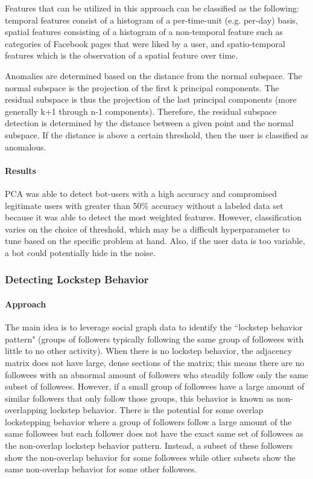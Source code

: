 \documentclass[11pt, oneside]{article}   	%
\begin{document}
\quad Features that can be utilized in this approach can be classified as the following: temporal features consist of a histogram of a per-time-unit (e.g. per-day) basis, spatial features consisting of a histogram of a non-temporal feature such as categories of Facebook pages that were liked by a user, and spatio-temporal features which is the observation of a spatial feature over time.

\quad Anomalies are determined based on the distance from the normal subspace.
The normal subspace is the projection of the first k principal components.
The residual subspace is thus the projection of the last principal components (more generally k+1 through n-1 components).
Therefore, the residual subspace detection is determined by the distance between a given point and the normal subspace.
If the distance is above a certain threshold, then the user is classified as anomalous.

\paragraph{Results}
\quad

\quad PCA was able to detect bot-users with a high accuracy and compromised legitimate users with greater than 50\% accuracy without a labeled data set because it was able to detect the most weighted features.
However, classification varies on the choice of threshold, which may be a difficult hyperparameter to tune based on the specific problem at hand.
Also, if the user data is too variable, a bot could potentially hide in the noise.

\subsubsection{Detecting Lockstep Behavior}

\paragraph{Approach}
\quad

\quad The main idea \cite{lockstep} is to leverage social graph data to identify the ``lockstep behavior pattern" (groups of followers typically following the same group of followees with little to no other activity).
When there is no lockstep behavior, the adjacency matrix does not have large, dense sections of the matrix; this means there are no followees with an abnormal amount of followers who steadily follow only the same subset of followees.
However, if a small group of followees have a large amount of similar followers that only follow those groups, this behavior is known as non-overlapping lockstep behavior.
There is the potential for some overlap lockstepping behavior where a group of followers follow a large amount of the same followees but each follower does not have the exact same set of followees as the non-overlap lockstep behavior pattern.
Instead, a subset of these followers show the non-overlap behavior for some followees while other subsets show the same non-overlap behavior for some other followees.
\end{document}
